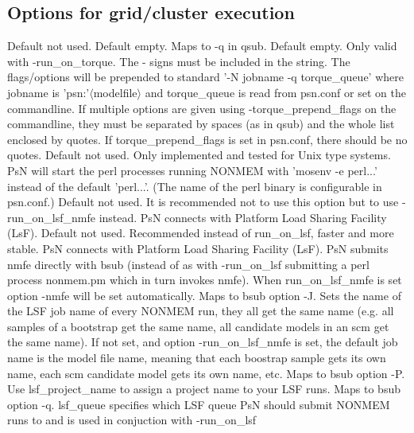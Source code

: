 \subsection{Options for grid/cluster execution}

\begin{optionlist}
Default not used.  
\nextopt
{}
Default empty. Maps to -q in qsub. 
\nextopt
{}
Default empty. Only valid with -run\_on\_torque. The - signs must be included in the string. The flags/options will be prepended to standard '-N jobname -q torque\_queue' where jobname is 'psn:'$\langle$modelfile$\rangle$ and torque\_queue is read from psn.conf or set on the commandline. If multiple options are given using -torque\_prepend\_flags on the commandline, they must be separated by spaces (as in qsub) and the whole list enclosed by quotes. If torque\_prepend\_flags is set in psn.conf, there should be no quotes. 
\nextopt
{}
Default not used. Only implemented and tested for Unix type systems. PsN will start the perl processes running NONMEM with 'mosenv -e perl...' instead of the default 'perl...'. (The name of the perl binary is configurable in psn.conf.) 
\nextopt
{}
Default not used. It is recommended not to use this option but to  use -run\_on\_lsf\_nmfe instead. PsN connects with Platform Load Sharing Facility (LsF).  
\nextopt
{}
Default not used. Recommended instead of run\_on\_lsf, faster and more stable. PsN connects with Platform Load Sharing Facility (LsF). PsN submits nmfe directly with bsub (instead of as with -run\_on\_lsf submitting a perl process nonmem.pm which in turn invokes nmfe). When run\_on\_lsf\_nmfe is set option -nmfe will be set automatically. 
\nextopt
{}
Maps to bsub option -J. Sets the name of the LSF job name of every NONMEM run, they all get the same name (e.g. all samples of a bootstrap get the same name, all candidate models in an scm get the same name). If not set, and option -run\_on\_lsf\_nmfe is set, the default job name is the model file name, meaning that each boostrap sample gets its own name, each scm candidate model gets its own name, etc. 
\nextopt
{}
Maps to bsub option -P. Use lsf\_project\_name to assign a project name to your LSF runs. 
\nextopt
{}
Maps to bsub option -q. lsf\_queue specifies which LSF queue PsN should submit NONMEM runs to and is used in conjuction with -run\_on\_lsf 

\end{optionlist}
